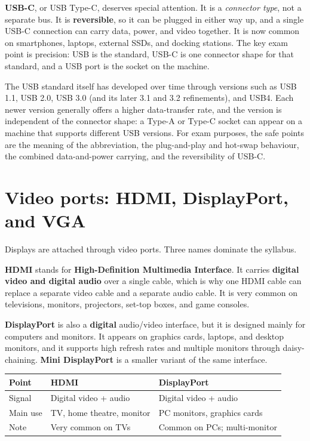 \documentclass[11pt]{article}
\begin{document}
\textbf{USB-C}, or USB Type-C, deserves special attention. It is a
\emph{connector type}, not a separate bus. It is \textbf{reversible}, so it
can be plugged in either way up, and a single USB-C connection can carry
data, power, and video together. It is now common on smartphones, laptops,
external SSDs, and docking stations. The key exam point is precision: USB is
the standard, USB-C is one connector shape for that standard, and a USB port
is the socket on the machine.

The USB standard itself has developed over time through versions such as USB
1.1, USB 2.0, USB 3.0 (and its later 3.1 and 3.2 refinements), and USB4. Each
newer version generally offers a higher data-transfer rate, and the version
is independent of the connector shape: a Type-A or Type-C socket can appear
on a machine that supports different USB versions. For exam purposes, the
safe points are the meaning of the abbreviation, the plug-and-play and
hot-swap behaviour, the combined data-and-power carrying, and the
reversibility of USB-C.

\section{Video ports: HDMI, DisplayPort, and VGA}
Displays are attached through video ports. Three names dominate the syllabus.

\textbf{HDMI} stands for \textbf{High-Definition Multimedia Interface}. It
carries \textbf{digital video and digital audio} over a single cable, which
is why one HDMI cable can replace a separate video cable and a separate audio
cable. It is very common on televisions, monitors, projectors, set-top boxes,
and game consoles.

\textbf{DisplayPort} is also a \textbf{digital} audio/video interface, but it
is designed mainly for computers and monitors. It appears on graphics cards,
laptops, and desktop monitors, and it supports high refresh rates and
multiple monitors through daisy-chaining. \textbf{Mini DisplayPort} is a
smaller variant of the same interface.

\begin{center}
\begin{tabular}{p{}p{}p{}}
\toprule
\textbf{Point} & \textbf{HDMI} & \textbf{DisplayPort} \\
\midrule
Signal & Digital video + audio & Digital video + audio \\
Main use & TV, home theatre, monitor & PC monitors, graphics cards \\
Note & Very common on TVs & Common on PCs; multi-monitor \\
\bottomrule
\end{tabular}
\end{center}
\end{document}
